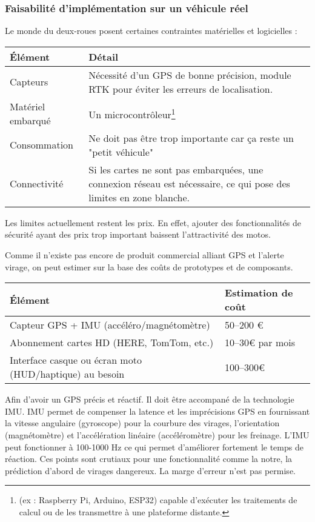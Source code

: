 \subsubsection{Faisabilité d’implémentation sur un véhicule réel}
Le monde du deux-roues posent certaines contraintes matérielles et logicielles :\\
\begin{tabular}{|l|l|}
\hline
\textbf{Élément} & \textbf{Détail} \\
\hline
Capteurs & Nécessité d’un GPS de bonne précision, module RTK pour éviter les erreurs de localisation.\\
Matériel embarqué & Un microcontrôleur\footnote{ (ex : Raspberry Pi, Arduino, ESP32) capable d’exécuter les traitements de calcul ou de les transmettre à une plateforme distante.}\\
Consommation & Ne doit pas être trop importante car ça reste un "petit véhicule" \\
Connectivité & Si les cartes ne sont pas embarquées, une connexion réseau est nécessaire, ce qui pose des limites en zone blanche.\\
\hline
\end{tabular}


Les limites actuellement restent les prix. En effet, ajouter des fonctionnalités de sécurité ayant des prix trop important baissent l'attractivité des motos. 

Comme il n’existe pas encore de produit commercial alliant GPS et l'alerte virage, on peut estimer sur la base des coûts de prototypes et de composants.\\

\begin{tabular}{|l|l|}
\hline
\textbf{Élément} & \textbf{Estimation de coût} \\
\hline
Capteur GPS + IMU (accéléro/magnétomètre)  & 50–200 € \\
Abonnement cartes HD (HERE, TomTom, etc.) &    10–30€ par mois   \\
Interface casque ou écran moto (HUD/haptique) au besoin & 100–300€ \\
\hline
\end{tabular}

\vspace{0.5cm}
Afin d'avoir un GPS précis et réactif. Il doit être accompané de la technologie IMU. IMU permet de compenser la latence et les imprécisions GPS en fournissant la vitesse angulaire (gyroscope) pour la courbure des virages, l'orientation (magnétomètre) et l'accélération linéaire (accéléromètre) pour les freinage. L'IMU peut fonctionner à 100-1000 Hz ce qui permet d'améliorer fortement le temps de réaction. Ces points sont crutiaux pour une fonctionnalité comme la notre, la prédiction d'abord de virages dangereux. La marge d'erreur n'est pas permise.

